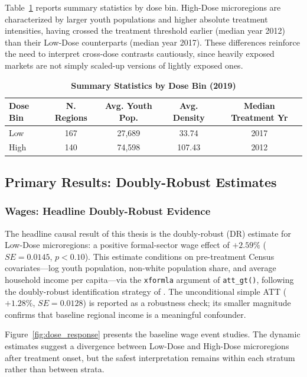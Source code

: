 Table~\ref{tab:att_baseline} reports summary statistics by dose bin. High-Dose microregions are characterized by larger youth populations and higher absolute treatment intensities, having crossed the treatment threshold earlier (median year 2012) than their Low-Dose counterparts (median year 2017). These differences reinforce the need to interpret cross-dose contrasts cautiously, since heavily exposed markets are not simply scaled-up versions of lightly exposed ones.

\begin{table}[ht]
\centering
\caption{\textbf{Summary Statistics by Dose Bin (2019)}}
\label{tab:att_baseline}
\begin{tabular}{lcccc}
\hline
\textbf{Dose Bin} & \textbf{N. Regions} & \textbf{Avg. Youth Pop.} & \textbf{Avg. Density} & \textbf{Median Treatment Yr} \\
\hline
Low & 167 & 27,689 & 33.74 & 2017 \\
High & 140 & 74,598 & 107.43 & 2012 \\
\hline
\end{tabular}
\end{table}

\subsection{Primary Results: Doubly-Robust Estimates}
\label{sec:pooled_results}

\subsubsection{Wages: Headline Doubly-Robust Evidence}

The headline causal result of this thesis is the doubly-robust (DR) estimate for Low-Dose microregions: a positive formal-sector wage effect of $+2.59\%$ ($SE = 0.0145$, $p < 0.10$). This estimate conditions on pre-treatment Census covariates---log youth population, non-white population share, and average household income per capita---via the \texttt{xformla} argument of \texttt{att\_gt()}, following the doubly-robust identification strategy of . The unconditional simple ATT ($+1.28\%$, $SE = 0.0128$) is reported as a robustness check; its smaller magnitude confirms that baseline regional income is a meaningful confounder.

Figure~\ref{fig:dose_response} presents the baseline wage event studies. The dynamic estimates suggest a divergence between Low-Dose and High-Dose microregions after treatment onset, but the safest interpretation remains within each stratum rather than between strata.

